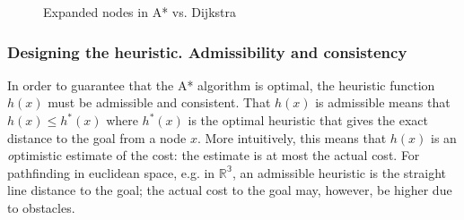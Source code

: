 \begin{figure}[ht]
\centering
{}
\qquad
{}
\caption{Expanded nodes in A* vs. Dijkstra}
\label{fig:astar_vs_dijkstra_expansion}
\end{figure}

\subsubsection{Designing the heuristic. Admissibility and consistency}
In order to guarantee that the A* algorithm is optimal, the heuristic function $h(x)$ must be admissible and consistent\cite{astar}. That $h(x)$ is admissible means that $h(x) \leq h^*(x)$ where $h^*(x)$ is the optimal heuristic that gives the exact distance to the goal from a node $x$. More intuitively, this means that $h(x)$ is an {\textit optimistic} estimate of the cost: the estimate is at most the actual cost. For pathfinding in euclidean space, e.g. in $\mathbb{R^3}$, an admissible heuristic is the straight line distance to the goal; the actual cost to the goal may, however, be higher due to obstacles.

